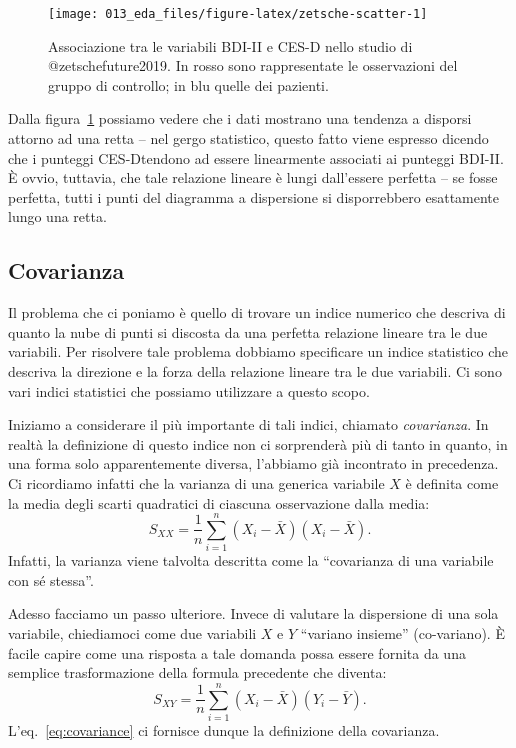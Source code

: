 \documentclass[
  10pt,
  italian,
  a4paper,
  extrafontsizes,onecolumn,openright
  ]{memoir}
\newlength{\rf}
\theoremstyle{definition}
\theoremstyle{definition}
\theoremstyle{definition}
\theoremstyle{definition}
\theoremstyle{remark}
\begin{document}
\begin{figure}[h]

{\centering \texttt{[image: 013\_eda\_files/figure-latex/zetsche-scatter-1]} 

}

\caption{Associazione tra le variabili BDI-II e CES-D nello studio di @zetschefuture2019. In rosso sono rappresentate le osservazioni del gruppo di controllo; in blu quelle dei pazienti.}\label{fig:zetsche-scatter}
\end{figure}

Dalla figura~\ref{fig:zetsche-scatter} possiamo vedere che i dati mostrano una tendenza a disporsi attorno ad una retta -- nel gergo statistico, questo fatto viene espresso dicendo che i punteggi CES-Dtendono ad essere linearmente associati ai punteggi BDI-II. È ovvio, tuttavia, che tale relazione lineare è lungi dall'essere perfetta -- se fosse perfetta, tutti i punti del diagramma a dispersione si disporrebbero esattamente lungo una retta.

\hypertarget{covarianza}{%
\subsection{Covarianza}\label{covarianza}}

Il problema che ci poniamo è quello di trovare un indice numerico che
descriva di quanto la nube di punti si discosta da una perfetta
relazione lineare tra le due variabili. Per risolvere tale problema
dobbiamo specificare un indice statistico che descriva la direzione e la
forza della relazione lineare tra le due variabili. Ci sono vari indici
statistici che possiamo utilizzare a questo scopo.

Iniziamo a considerare il più importante di tali indici, chiamato
\emph{covarianza}. In realtà la definizione di questo indice non ci
sorprenderà più di tanto in quanto, in una forma solo apparentemente
diversa, l'abbiamo già incontrato in precedenza. Ci ricordiamo infatti
che la varianza di una generica variabile \(X\) è definita come la media
degli scarti quadratici di ciascuna osservazione dalla media:
\begin{equation}
S_{XX} = \frac{1}{n} \sum_{i=1}^n(X_i - \bar{X}) (X_i - \bar{X}).
\label{eq:variance2}
\end{equation}
Infatti, la varianza viene talvolta descritta come la ``covarianza di una
variabile con sé stessa''.

Adesso facciamo un passo ulteriore. Invece di valutare la dispersione di
una sola variabile, chiediamoci come due variabili \(X\) e \(Y\) ``variano
insieme'' (co-variano). È facile capire come una risposta a tale domanda
possa essere fornita da una semplice trasformazione della formula
precedente che diventa:
\begin{equation}
S_{XY} = \frac{1}{n} \sum_{i=1}^n(X_i - \bar{X}) (Y_i - \bar{Y}).
\label{eq:covariance}
\end{equation}
L'eq.~\eqref{eq:covariance} ci fornisce dunque la definizione della covarianza.
\end{document}

